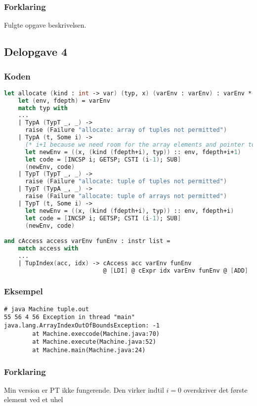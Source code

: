 \subsubsection{Forklaring}
Fulgte opgave beskrivelsen.

\subsection{Delopgave 4}\label{ass:3-4}
\subsubsection{Koden}
\begin{lstlisting}[language=fsharp]
let allocate (kind : int -> var) (typ, x) (varEnv : varEnv) : varEnv * instr list =
    let (env, fdepth) = varEnv 
    match typ with
    ...
    | TypA (TypT _, _) -> 
      raise (Failure "allocate: array of tuples not permitted")
    | TypA (t, Some i) ->
      (* i+1 because we need room for the array elements and pointer to first element. *)        
      let newEnv = ((x, (kind (fdepth+i), typ)) :: env, fdepth+i+1)  
      let code = [INCSP i; GETSP; CSTI (i-1); SUB]
      (newEnv, code)
    | TypT (TypT _, _) -> 
      raise (Failure "allocate: tuple of tuples not permitted")
    | TypT (TypA _, _) -> 
      raise (Failure "allocate: tuple of arrays not permitted")
    | TypT (t, Some i) ->
      let newEnv = ((x, (kind (fdepth+i), typ)) :: env, fdepth+i)  
      let code = [INCSP i; GETSP; CSTI (i-1); SUB]
      (newEnv, code)

and cAccess access varEnv funEnv : instr list =
    match access with 
    ...
    | TupIndex(acc, idx) -> cAccess acc varEnv funEnv 
                            @ [LDI] @ cExpr idx varEnv funEnv @ [ADD]
\end{lstlisting}

\subsubsection{Eksempel}
\begin{lstlisting}
# java Machine tuple.out
55 56 4 56 Exception in thread "main" java.lang.ArrayIndexOutOfBoundsException: -1
        at Machine.execcode(Machine.java:70)
        at Machine.execute(Machine.java:52)
        at Machine.main(Machine.java:24)
\end{lstlisting}

\subsubsection{Forklaring}
Min version er PT ikke fungerende. Den virker indtil $i=0$ overskriver det første element ved et uhel


